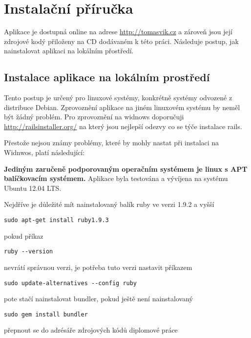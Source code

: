 \chapter{Instalační příručka}
Aplikace je dostupná online na adrese \url{http://tomasvik.cz} a zároveň jsou její zdrojové kodý přiloženy na CD dodávaném k této práci. Následuje postup, jak nainstalovat aplikaci na lokálním přostředí.

\section{Instalace aplikace na lokálním prostředí}
Tento postup je určený pro linuxové systémy, konkrétně systémy odvozené z distribuce Debian. Zprovoznění aplikace na jiném linuxovém systému by neměl být žádný problém. Pro zprovoznění na widnows doporučuji \url{http://railsinstaller.org/} na který jsou nejlepší odezvy co se týče instalace rails.

Přestože nejsou známy problémy, které by mohly nastat při instalaci na Widnwos, platí následující:

\textbf{Jediným zaručeně podporovaným operačním systémem je linux s APT balíčkovacím systémem.} Aplikace byla testována a vývíjena na systému Ubuntu 12.04 LTS.

Nejdříve je důležité mít nainstalovaný balík ruby ve verzi 1.9.2 a vyšší

\lstset{language = bash, style=custom}
\begin{lstlisting}
sudo apt-get install ruby1.9.3
\end{lstlisting}

pokud příkaz

\begin{lstlisting}
ruby --version
\end{lstlisting}

nevrátí správnou verzi, je potřeba tuto verzi nastavit příkazem

\begin{lstlisting}
sudo update-alternatives --config ruby
\end{lstlisting}

pote stačí nainstalovat bundler, pokud ještě není nainstalovaný

\begin{lstlisting}
sudo gem install bundler
\end{lstlisting}

přepnout se do adrésáře zdrojových kódů diplomové práce

